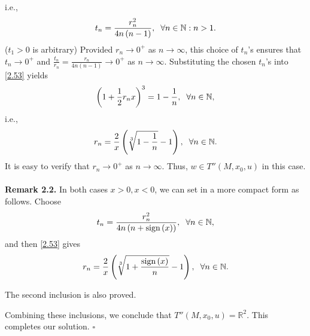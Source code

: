 \documentclass[a4paper]{article}
\numberwithin{equation}{section}
\begin{document}
\begin{enumerate}
\begin{enumerate}
\begin{itemize}
i.e.,
\begin{align}
{t_n} = \frac{{r_n^2}}{{4n\left( {n - 1} \right)}},\hspace{0.2cm}\forall n \in \mathbb{N}:n>1.
\end{align}
($t_1>0$ is arbitrary) Provided $r_n\to 0^+$ as $n\to \infty$, this choice of $t_n$'s ensures that $t_n\to 0^+$ and $\frac{{{t_n}}}{{{r_n}}} = \frac{{{r_n}}}{{4n\left( {n - 1} \right)}} \to {0^ + }$ as $n\to \infty$. Substituting the chosen $t_n$'s into \eqref{2.53} yields
\begin{align}
{\left( {1 + \frac{1}{2}{r_n}x} \right)^3} = 1 - \frac{1}{n},\hspace{0.2cm}\forall n \in \mathbb{N},
\end{align}
i.e.,
\begin{align}
{r_n} = \frac{2}{x}\left( {\sqrt[3]{{1 - \frac{1}{n}}} - 1} \right),\hspace{0.2cm}\forall n \in \mathbb{N}.
\end{align}
It is easy to verify that $r_n\to 0^+$ as $n\to \infty$. Thus, $w\in T''\left(M,x_0,u\right)$ in this case.\\
\\
\textbf{Remark 2.2.} In both cases $x>0,x<0$, we can set in a more compact form as follows. Choose
\begin{align}
{t_n} = \frac{{r_n^2}}{{4n\left( {n + \mbox{sign}\left( x \right)} \right)}},\hspace{0.2cm}\forall n \in \mathbb{N},
\end{align}
and then \eqref{2.53} gives 
\begin{align}
{r_n} = \frac{2}{x}\left( {\sqrt[3]{{1 + \frac{{\mbox{sign}\left( x \right)}}{n}}} - 1} \right),\hspace{0.2cm}\forall n \in \mathbb{N}.
\end{align}
\end{itemize}
\end{enumerate}
The second inclusion is also proved.
\end{enumerate}
Combining these inclusions, we conclude that $T''\left( {M,{x_0},u} \right) = \mathbb{R}^2$. This completes our solution. \hfill $\square$\\
\end{document}
